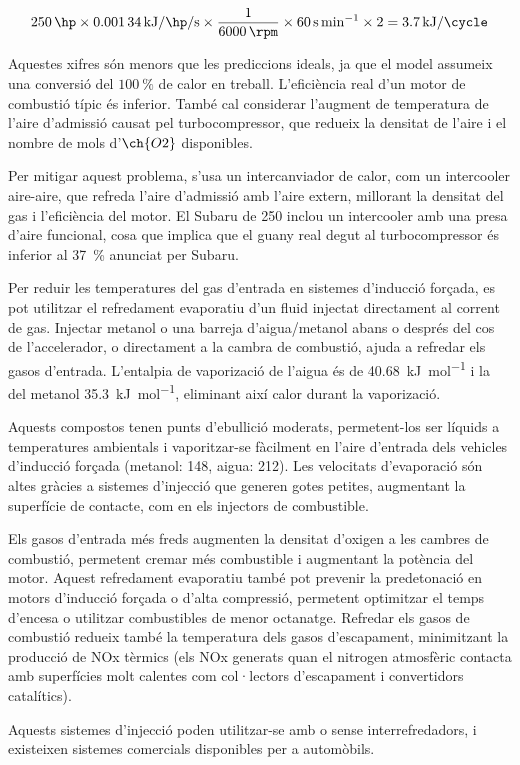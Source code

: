 \begin{equation}
    \qty{250}{\hp} \times \qty{0.00134}{\kilo\joule\per\hp\per\second} \times \frac{1}{\qty{6000}{\rpm}} \times \qty{60}{\second\per\minute} \times 2 = \qty{3.7}{\kilo\joule\per\cycle}
\end{equation}

Aquestes xifres són menors que les prediccions ideals, ja que el model assumeix una conversió del \(\qty{100}{\percent}\) de calor en treball. L'eficiència real d'un motor de combustió típic és inferior. També cal considerar l'augment de temperatura de l'aire d'admissió causat pel turbocompressor, que redueix la densitat de l'aire i el nombre de mols d'\(\ch{O2}\) disponibles.


Per mitigar aquest problema, s'usa un intercanviador de calor, com un intercooler aire-aire, que refreda l'aire d'admissió amb l'aire extern, millorant la densitat del gas i l'eficiència del motor. El Subaru de \qty{250}{\hp} inclou un intercooler amb una presa d'aire funcional, cosa que implica que el guany real degut al turbocompressor és inferior al \qty{37}{\percent} anunciat per Subaru.

\begin{mybox}[title=Sistemes d'injecció metanol/aigua]
    Per reduir les temperatures del gas d'entrada en sistemes d'inducció forçada, es pot utilitzar el refredament evaporatiu d'un fluid injectat directament al corrent de gas. Injectar metanol o una barreja d'aigua/metanol abans o després del cos de l'accelerador, o directament a la cambra de combustió, ajuda a refredar els gasos d'entrada. L'entalpia de vaporizació de l'aigua és de \qty{40.68}{\kilo\joule\per\mole} i la del metanol \qty{35.3}{\kilo\joule\per\mole}, eliminant així calor durant la vaporizació. 

Aquests compostos tenen punts d'ebullició moderats, permetent-los ser líquids a temperatures ambientals i vaporitzar-se fàcilment en l'aire d'entrada dels vehicles d'inducció forçada (metanol: \qty{148}{\degreeFahrenheit}, aigua: \qty{212}{\degreeFahrenheit}). Les velocitats d'evaporació són altes gràcies a sistemes d'injecció que generen gotes petites, augmentant la superfície de contacte, com en els injectors de combustible.

Els gasos d'entrada més freds augmenten la densitat d'oxigen a les cambres de combustió, permetent cremar més combustible i augmentant la potència del motor. Aquest refredament evaporatiu també pot prevenir la predetonació en motors d'inducció forçada o d'alta compressió, permetent optimitzar el temps d'encesa o utilitzar combustibles de menor octanatge. Refredar els gasos de combustió redueix també la temperatura dels gasos d'escapament, minimitzant la producció de NOx tèrmics (els NOx generats quan el nitrogen atmosfèric contacta amb superfícies molt calentes com col·lectors d'escapament i convertidors catalítics). 

Aquests sistemes d'injecció poden utilitzar-se amb o sense interrefredadors, i existeixen sistemes comercials disponibles per a automòbils\cite{bowers_understanding_2014}.
\end{mybox}

